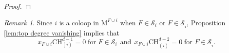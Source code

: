 \documentclass[11pt,reqno]{amsart}
\theoremstyle{definition}
\theoremstyle{remark}
\newtheorem{remark}[theorem]{Remark}
\renewcommand{\dim}{\operatorname{dim}}
\newcommand{\crk}{\operatorname{crk}}
\renewcommand{\(}{\left(}
\renewcommand{\)}{\right)}
\newcommand{\<}{\left<}
\renewcommand{\>}{\right>}
\newcommand{\rk}{\operatorname{rk}}
\newcommand{\CH}{\operatorname{CH}}
\newcommand{\uvarphi}{\underline{\varphi}}
\begin{document}
\begin{proof}
\end{proof}

\begin{remark}\label{rem:top degree vanishing}
Since  $i$ is a coloop in $\mathrm{M}^{F \cup i}$ when $F\in \mathscr{S}_i$ or $F\in \underline{\mathscr{S}}_i$, 
 Proposition \ref{lem:top degree vanishing} implies that
\[
x_{F\cup i}\mathrm{CH}_{(i)}^{d-1}=0\; \text{for $F\in \mathscr{S}_i$} 
\ \ \text{and} \ \ 
 x_{F\cup i}\underline{\mathrm{CH}}_{(i)}^{d-2}=0\; \text{for $F\in \underline{\mathscr{S}}_i$}.
\]
\end{remark}
\end{document}
